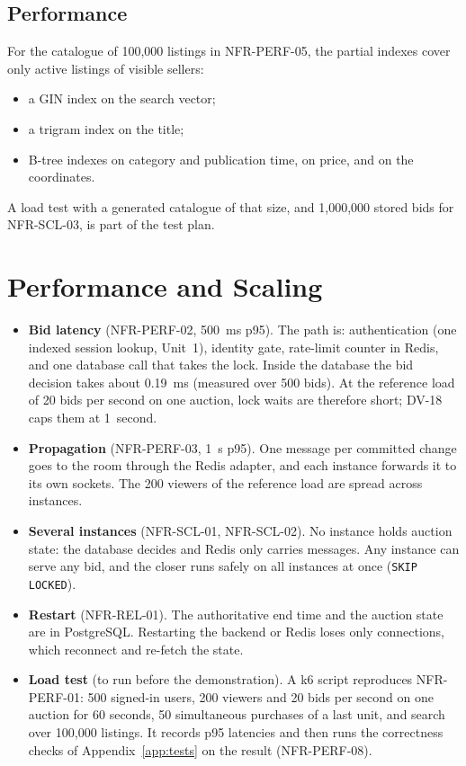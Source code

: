 \documentclass[11pt,a4paper]{article}
\begin{document}
\subsection{Performance}
For the catalogue of 100{,}000 listings in NFR-PERF-05, the partial indexes cover only active listings of visible sellers:
\begin{itemize}[nosep]
  \item a GIN index on the search vector;
  \item a trigram index on the title;
  \item B-tree indexes on category and publication time, on price, and on the coordinates.
\end{itemize}
A load test with a generated catalogue of that size, and 1{,}000{,}000 stored bids for NFR-SCL-03, is part of the test plan.
\section{Performance and Scaling}
\begin{itemize}[nosep]
  \item \textbf{Bid latency} (NFR-PERF-02, 500~ms p95). The path is: authentication (one indexed session lookup, Unit~1), identity gate, rate-limit counter in Redis, and one database call that takes the lock. Inside the database the bid decision takes about 0.19~ms (measured over 500 bids). At the reference load of 20 bids per second on one auction, lock waits are therefore short; DV-18 caps them at 1~second.
  \item \textbf{Propagation} (NFR-PERF-03, 1~s p95). One message per committed change goes to the room through the Redis adapter, and each instance forwards it to its own sockets. The 200 viewers of the reference load are spread across instances.
  \item \textbf{Several instances} (NFR-SCL-01, NFR-SCL-02). No instance holds auction state: the database decides and Redis only carries messages. Any instance can serve any bid, and the closer runs safely on all instances at once (\texttt{SKIP LOCKED}).
  \item \textbf{Restart} (NFR-REL-01). The authoritative end time and the auction state are in PostgreSQL. Restarting the backend or Redis loses only connections, which reconnect and re-fetch the state.
  \item \textbf{Load test} (to run before the demonstration). A k6 script reproduces NFR-PERF-01: 500 signed-in users, 200 viewers and 20 bids per second on one auction for 60 seconds, 50 simultaneous purchases of a last unit, and search over 100{,}000 listings. It records p95 latencies and then runs the correctness checks of Appendix~\ref{app:tests} on the result (NFR-PERF-08).
\end{itemize}
\end{document}
